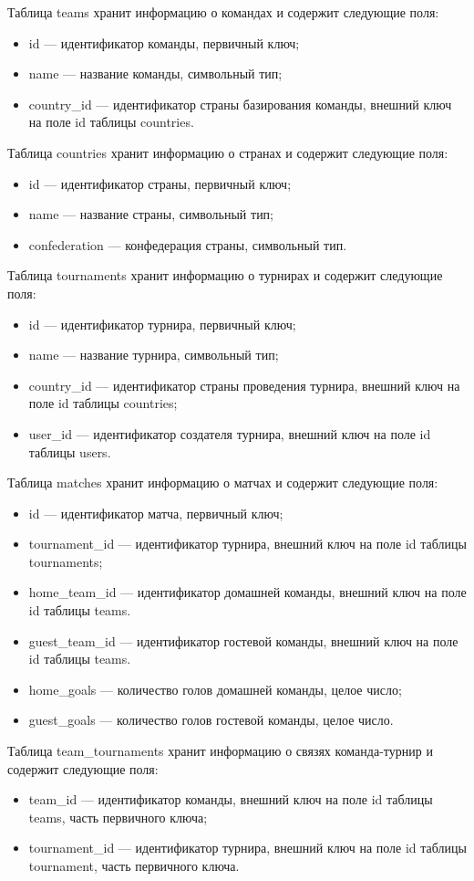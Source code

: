 Таблица teams хранит информацию о командах и содержит следующие поля:
\begin{itemize}
    \item id --- идентификатор команды, первичный ключ; 
    \item name --- название команды, символьный тип;
    \item country\_id --- идентификатор страны базирования команды, внешний ключ на поле id таблицы countries.
\end{itemize}

Таблица countries хранит информацию о странах и содержит следующие поля:
\begin{itemize}
    \item id --- идентификатор страны, первичный ключ; 
    \item name --- название страны, символьный тип;
    \item confederation --- конфедерация страны, символьный тип.
\end{itemize}

Таблица tournaments хранит информацию о турнирах и содержит следующие поля:
\begin{itemize}
    \item id --- идентификатор турнира, первичный ключ; 
    \item name --- название турнира, символьный тип;
    \item country\_id --- идентификатор страны проведения турнира, внешний ключ на поле id таблицы countries;
    \item user\_id --- идентификатор создателя турнира, внешний ключ на поле id таблицы users.
\end{itemize}

Таблица matches хранит информацию о матчах и содержит следующие поля:
\begin{itemize}
    \item id --- идентификатор матча, первичный ключ; 
    \item tournament\_id --- идентификатор турнира, внешний ключ на поле id таблицы tournaments;
    \item home\_team\_id --- идентификатор домашней команды, внешний ключ на поле id таблицы teams.
    \item guest\_team\_id --- идентификатор гостевой команды, внешний ключ на поле id таблицы teams.
    \item home\_goals --- количество голов домашней команды, целое число;
    \item guest\_goals --- количество голов гостевой команды, целое число.
\end{itemize}
\newpage
Таблица team\_tournaments хранит информацию о связях команда-турнир и содержит следующие поля:
\begin{itemize}
    \item team\_id --- идентификатор команды, внешний ключ на поле id таблицы teams, часть первичного ключа;
    \item tournament\_id --- идентификатор турнира, внешний ключ на поле id таблицы tournament, часть первичного ключа.
\end{itemize}

